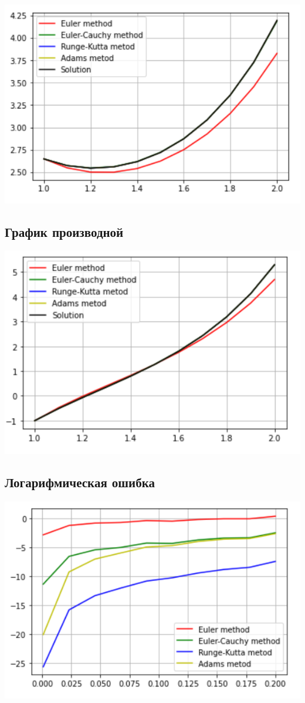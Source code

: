\documentclass[pdf, unicode, 12pt, a4paper,oneside,fleqn]{article}
\begin{document}
\includegraphics[scale=0.45]{data1.png}

\subsection{График производной}

\includegraphics[scale=0.45]{data2.png}

\subsection{Логарифмическая ошибка}

\includegraphics[scale=0.45]{data3.png}
\end{document}
